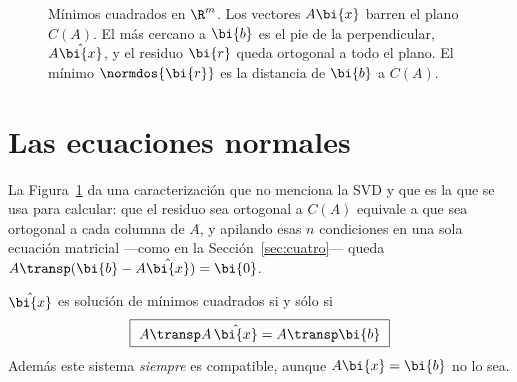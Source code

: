 \begin{figure}[htbp]
\centering
{}
\caption{Mínimos cuadrados en $\R^m$. Los vectores $A\bi{x}$ barren el plano
$C(A)$. El más cercano a $\bi{b}$ es el pie de la perpendicular, $A\hat{\bi{x}}$,
y el residuo $\bi{r}$ queda ortogonal a todo el plano. El mínimo
$\normdos{\bi{r}}$ es la distancia de $\bi{b}$ a $C(A)$.}
\label{mc-fig:proyeccion}
\end{figure}

\section{Las ecuaciones normales}\label{mc-sec:normales}

La Figura~\ref{mc-fig:proyeccion} da una caracterización que no menciona la
SVD y que es la que se usa para calcular: que el residuo sea ortogonal a
$C(A)$ equivale a que sea ortogonal a cada columna de $A$, y apilando esas $n$
condiciones en una sola ecuación matricial ---como en la
Sección~\ref{sec:cuatro}--- queda $A\transp(\bi{b}-A\hat{\bi{x}})=\bi{0}$.

\begin{theorem}\label{mc-teo:normales}
$\hat{\bi{x}}$ es solución de mínimos cuadrados si y sólo si
\begin{equation}\label{mc-eq:normales}
\boxed{\ A\transp A\,\hat{\bi{x}}=A\transp\bi{b}\ }
\end{equation}
Además este sistema \emph{siempre} es compatible, aunque $A\bi{x}=\bi{b}$ no lo
sea.
\end{theorem}

